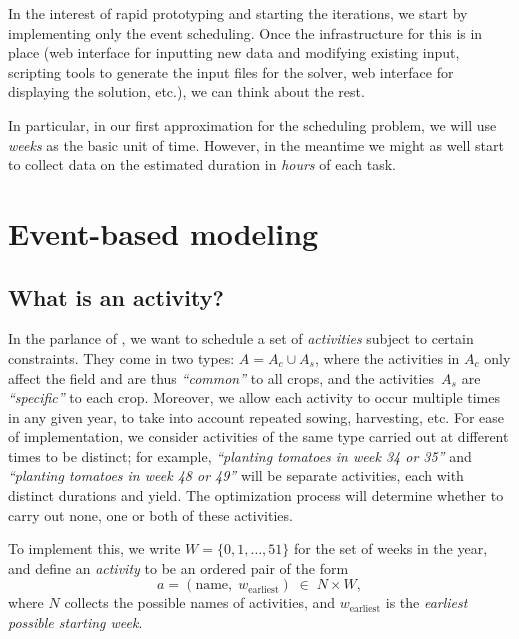 \documentclass[11pt,reqno]{amsart}
\numberwithin{equation}{section}
\begin{document}
In the interest of rapid prototyping and starting the iterations, we start by implementing
only the event scheduling. Once the infrastructure for this is in place (web interface for
inputting new data and modifying existing input, scripting tools to generate the input
files for the solver, web interface for displaying the solution, etc.), we can think about
the rest.

In particular, in our first approximation for the scheduling problem, we will use
\emph{weeks} as the basic unit of time. However, in the meantime we might as well start to
collect data on the estimated duration in \emph{hours} of each task.


\section{Event-based modeling}


\subsection{What is an activity?}

In the parlance of \cite{artigues-etal11}, we want to schedule a set
of \emph{activities} subject to certain constraints. 
%
%
They come in two types: $A=A_c\cup A_s$, where the activities in $A_c$
only affect the field and are thus \emph{``common''} to all crops, and
the activities~$A_s$ are \emph{``specific''} to each crop. Moreover,
we allow each activity to occur multiple times in any given year, to
take into account repeated sowing, harvesting, etc.  For ease of
implementation, we consider activities of the same type carried out at
different times to be distinct; for example, \emph{``planting tomatoes
  in week 34 or 35''} and \emph{``planting tomatoes in week 48 or
  49''} will be separate activities, each with distinct durations and
yield. The optimization process will determine whether to carry out
none, one or both of these activities.

To implement this, we write $W=\{0,1,\dots,51\}$ for the set of weeks
in the year, and define an \emph{activity} to be an ordered pair of
the form
\[
  a = (\text{name}, \; w_{\text{earliest}}) \;\in\;
  N\times W,
\]
where $N$ collects the possible names of activities, and $w_{\text{earliest}}$ is the
\emph{earliest possible starting week}.
\end{document}
